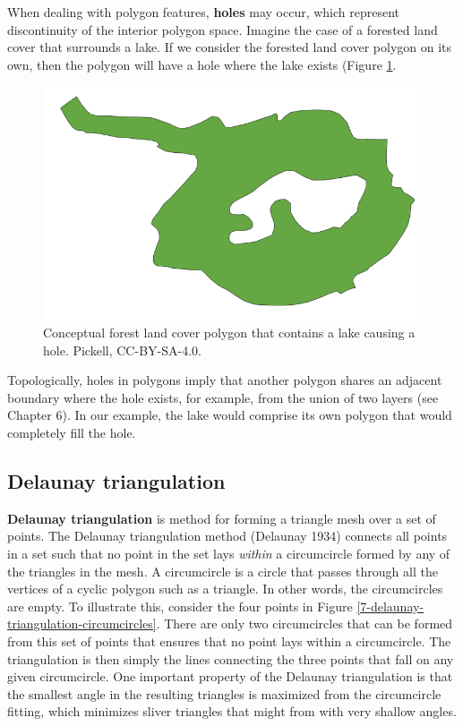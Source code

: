 \documentclass[
]{book}
\begin{document}
When dealing with polygon features, \textbf{holes} may occur, which represent discontinuity of the interior polygon space. Imagine the case of a forested land cover that surrounds a lake. If we consider the forested land cover polygon on its own, then the polygon will have a hole where the lake exists (Figure \ref{fig:7-hole}.

\begin{figure}
\includegraphics[width=0.5\linewidth]{images/07-hole} \caption{Conceptual forest land cover polygon that contains a lake causing a hole. Pickell, CC-BY-SA-4.0.}\label{fig:7-hole}
\end{figure}

Topologically, holes in polygons imply that another polygon shares an adjacent boundary where the hole exists, for example, from the union of two layers (see Chapter 6). In our example, the lake would comprise its own polygon that would completely fill the hole.

\hypertarget{delaunay-triangulation}{%
\subsection{Delaunay triangulation}\label{delaunay-triangulation}}

\textbf{Delaunay triangulation} is method for forming a triangle mesh over a set of points. The Delaunay triangulation method (Delaunay 1934) connects all points in a set such that no point in the set lays \emph{within} a circumcircle formed by any of the triangles in the mesh. A circumcircle is a circle that passes through all the vertices of a cyclic polygon such as a triangle. In other words, the circumcircles are empty. To illustrate this, consider the four points in Figure \ref{7-delaunay-triangulation-circumcircles}. There are only two circumcircles that can be formed from this set of points that ensures that no point lays within a circumcircle. The triangulation is then simply the lines connecting the three points that fall on any given circumcircle. One important property of the Delaunay triangulation is that the smallest angle in the resulting triangles is maximized from the circumcircle fitting, which minimizes sliver triangles that might from with very shallow angles.
\end{document}
